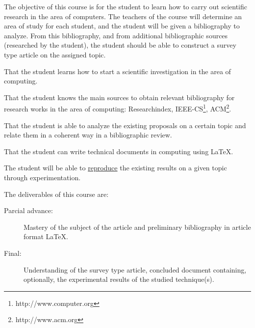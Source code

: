 \begin{syllabus}


\begin{justification}
  The objective of this course is for the student to learn how to carry out scientific research in the area of computers. The teachers of the course will determine an area of study for each student, and the student will be given a bibliography to analyze. From this bibliography, and from additional bibliographic sources (researched by the student), the student should be able to construct a survey type article on the assigned topic.
\end{justification}

\begin{goals}
\item That the student learns how to start a scientific investigation in the area of computing.
\item That the student knows the main sources to obtain relevant bibliography for research works in the area of computing: Researchindex, IEEE-CS\footnote{http://www.computer.org}, ACM\footnote{http://www.acm.org}.
\item That the student is able to analyze the existing proposals on a certain topic and relate them in a coherent way in a bibliographic review.
\item That the student can write technical documents in computing using \LaTeX.
\item The student will be able to \underline{reproduce} the existing results on a given topic through experimentation.
\item The deliverables of this course are:
	\begin{description}
	\item [Parcial advance:] Mastery of the subject of the article and preliminary bibliography in article format \LaTeX.
	\item [Final:] Understanding of the survey type article, concluded document containing, optionally, the experimental results of the studied technique(s).
	\end{description}
\end{goals}


\end{syllabus}
